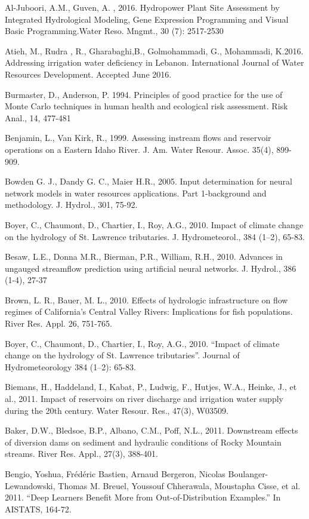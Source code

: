 \begin{hangingpar}{2em}
Al-Juboori, A.M., Guven, A.	, 2016. Hydropower Plant Site Assessment by Integrated Hydrological Modeling, Gene Expression Programming and Visual Basic Programming.Water Reso. Mngmt., 30 (7): 2517-2530

Atieh, M., Rudra , R., Gharabaghi,B., Golmohammadi, G.,  Mohammadi, K.2016. Addressing irrigation water deficiency in Lebanon. International Journal of Water Resources Development. Accepted June 2016.

Burmaster, D., Anderson, P. 1994. Principles of good practice for the use of Monte Carlo techniques in human health and ecological risk assessment. Risk Anal., 14, 477-481

Benjamin, L., Van Kirk, R., 1999. Assessing instream flows and reservoir operations on a Eastern Idaho River. J. Am. Water Resour. Assoc. 35(4), 899-909. 

Bowden G. J., Dandy G. C., Maier H.R., 2005.  Input determination for neural network models in water resources applications. Part 1-background and methodology. J. Hydrol., 301, 75-92.

Boyer, C., Chaumont, D., Chartier, I., Roy, A.G., 2010. Impact of climate change on the hydrology of St. Lawrence tributaries. J. Hydrometeorol., 384 (1–2), 65-83.

Besaw, L.E., Donna M.R., Bierman, P.R., William, R.H., 2010.  Advances in ungauged streamflow prediction using artificial neural networks. J. Hydrol., 386 (1-4), 27-37

Brown, L. R., Bauer, M. L., 2010. Effects of hydrologic infrastructure on flow regimes of California’s Central Valley Rivers: Implications for fish populations.  River Res. Appl. 26, 751-765.

Boyer, C., Chaumont, D., Chartier, I., Roy, A.G., 2010. ``Impact of climate change on the hydrology of St. Lawrence tributaries''. Journal of Hydrometeorology 384 (1–2): 65-83.

Biemans, H., Haddeland, I., Kabat, P., Ludwig, F., Hutjes, W.A., Heinke, J., et al., 2011. Impact of reservoirs on river discharge and irrigation water supply during the 20th century. Water Resour. Res., 47(3), W03509. 

Baker, D.W., Bledsoe, B.P., Albano, C.M., Poff, N.L., 2011. Downstream effects of diversion dams on sediment and hydraulic conditions of Rocky Mountain streams. River Res. Appl., 27(3), 388-401.

Bengio, Yoshua, Frédéric Bastien, Arnaud Bergeron, Nicolas Boulanger-Lewandowski, Thomas M. Breuel, Youssouf Chherawala, Moustapha Cisse, et al. 2011. ``Deep Learners Benefit More from Out-of-Distribution Examples.'' In AISTATS, 164-72.


\end{hangingpar}
